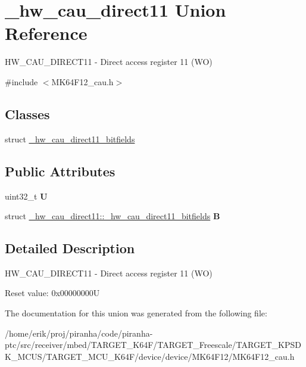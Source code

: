\hypertarget{union__hw__cau__direct11}{}\section{\+\_\+hw\+\_\+cau\+\_\+direct11 Union Reference}
\label{union__hw__cau__direct11}


H\+W\+\_\+\+C\+A\+U\+\_\+\+D\+I\+R\+E\+C\+T11 -\/ Direct access register 11 (WO)  




{\ttfamily \#include $<$M\+K64\+F12\+\_\+cau.\+h$>$}

\subsection*{Classes}
\begin{DoxyCompactItemize}
\item 
struct \hyperlink{struct__hw__cau__direct11_1_1__hw__cau__direct11__bitfields}{\+\_\+hw\+\_\+cau\+\_\+direct11\+\_\+bitfields}
\end{DoxyCompactItemize}
\subsection*{Public Attributes}
\begin{DoxyCompactItemize}
\item 
uint32\+\_\+t {\bfseries U}\hypertarget{union__hw__cau__direct11_a10cf219f38c2924ea39ced0fcf0ae454}{}\label{union__hw__cau__direct11_a10cf219f38c2924ea39ced0fcf0ae454}

\item 
struct \hyperlink{struct__hw__cau__direct11_1_1__hw__cau__direct11__bitfields}{\+\_\+hw\+\_\+cau\+\_\+direct11\+::\+\_\+hw\+\_\+cau\+\_\+direct11\+\_\+bitfields} {\bfseries B}\hypertarget{union__hw__cau__direct11_a8c76db97ea1798f228361f609294e70f}{}\label{union__hw__cau__direct11_a8c76db97ea1798f228361f609294e70f}

\end{DoxyCompactItemize}


\subsection{Detailed Description}
H\+W\+\_\+\+C\+A\+U\+\_\+\+D\+I\+R\+E\+C\+T11 -\/ Direct access register 11 (WO) 

Reset value\+: 0x00000000U 

The documentation for this union was generated from the following file\+:\begin{DoxyCompactItemize}
\item 
/home/erik/proj/piranha/code/piranha-\/ptc/src/receiver/mbed/\+T\+A\+R\+G\+E\+T\+\_\+\+K64\+F/\+T\+A\+R\+G\+E\+T\+\_\+\+Freescale/\+T\+A\+R\+G\+E\+T\+\_\+\+K\+P\+S\+D\+K\+\_\+\+M\+C\+U\+S/\+T\+A\+R\+G\+E\+T\+\_\+\+M\+C\+U\+\_\+\+K64\+F/device/device/\+M\+K64\+F12/M\+K64\+F12\+\_\+cau.\+h\end{DoxyCompactItemize}
